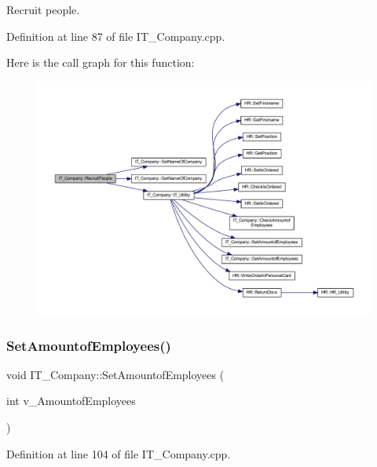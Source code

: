 Recruit people. 



Definition at line 87 of file I\+T\+\_\+\+Company.\+cpp.

Here is the call graph for this function\+:
\nopagebreak
\begin{figure}[H]
\begin{center}
\leavevmode
\includegraphics[width=350pt]{class_i_t___company_a2753c0f3da2fb8aee6a48b3ebe3bef79_cgraph}
\end{center}
\end{figure}
\mbox{\label{class_i_t___company_a918bdfd512ef8267cf082a20e86a63e9}} 
\subsubsection{\texorpdfstring{Set\+Amountof\+Employees()}{SetAmountofEmployees()}}
{\footnotesize\ttfamily void I\+T\+\_\+\+Company\+::\+Set\+Amountof\+Employees (\begin{DoxyParamCaption}\item[{int}]{v\+\_\+\+Amountof\+Employees }\end{DoxyParamCaption})}



Definition at line 104 of file I\+T\+\_\+\+Company.\+cpp.

